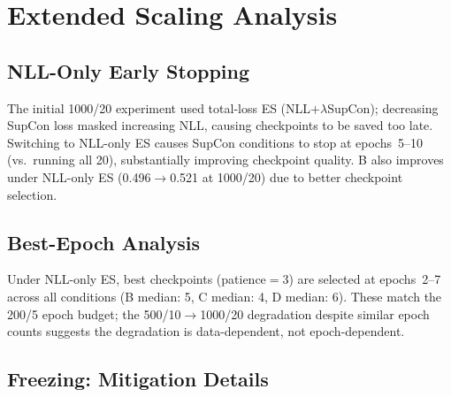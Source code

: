 \section{Extended Scaling Analysis}
\label{app:extended_scaling}

\subsection{NLL-Only Early Stopping}
\label{app:nll_es}

The initial 1000/20 experiment used total-loss ES
(NLL$+\lambda$SupCon); decreasing SupCon loss masked increasing NLL,
causing checkpoints to be saved too late.
Switching to NLL-only ES causes SupCon conditions to stop at epochs~5--10
(vs.\ running all 20), substantially improving checkpoint quality.
B also improves under NLL-only ES (0.496$\to$0.521 at 1000/20) due to better
checkpoint selection.

\subsection{Best-Epoch Analysis}
\label{app:best_epoch}

Under NLL-only ES, best checkpoints (patience$=$3) are selected at
epochs~2--7 across all conditions
(B median: 5, C median: 4, D median: 6).
These match the 200/5 epoch budget; the 500/10$\to$1000/20 degradation
despite similar epoch counts suggests the degradation is data-dependent,
not epoch-dependent.

\subsection{Freezing: Mitigation Details}
\label{app:freezing_details}

